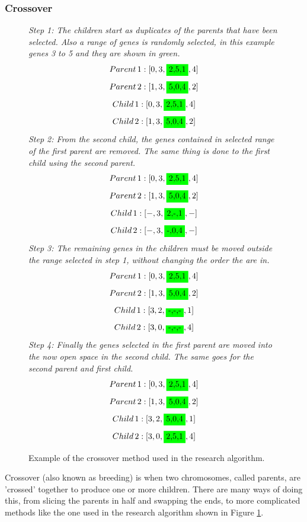 \subsubsection{Crossover}\label{crossover}
\par
\begin{figure}[H]
\textit{Step 1: The children start as duplicates of the parents that have been selected. Also a range of genes is randomly selected, in this example genes 3 to 5 and they are shown in green.}
\[Parent\, 1: [0,3,\colorbox{green}{2,5,1},4]\]
\[Parent\, 2: [1,3,\colorbox{green}{5,0,4},2]\]
\[Child\, 1: [0,3,\colorbox{green}{2,5,1},4]\]
\[Child\, 2: [1,3,\colorbox{green}{5,0,4},2]\]
\textit{Step 2: From the second child, the genes contained in selected range of the first parent are removed. The same thing is done to the first child using the second parent.}
\[Parent\, 1: [0,3,\colorbox{green}{2,5,1},4]\]
\[Parent\, 2: [1,3,\colorbox{green}{5,0,4},2]\]
\[Child\, 1: [-,3,\colorbox{green}{2,-,1},-]\]
\[Child\, 2: [-,3,\colorbox{green}{-,0,4},-]\]
\textit{Step 3: The remaining genes in the children must be moved outside the range selected in step 1, without changing the order the are in.}
\[Parent\, 1: [0,3,\colorbox{green}{2,5,1},4]\]
\[Parent\, 2: [1,3,\colorbox{green}{5,0,4},2]\]
\[Child\, 1: [3,2,\colorbox{green}{-,-,-},1]\]
\[Child\, 2: [3,0,\colorbox{green}{-,-,-},4]\]
\textit{Step 4: Finally the genes selected in the first parent are moved into the now open space in the second child. The same goes for the second parent and first child.}
\[Parent\, 1: [0,3,\colorbox{green}{2,5,1},4]\]
\[Parent\, 2: [1,3,\colorbox{green}{5,0,4},2]\]
\[Child\, 1: [3,2,\colorbox{green}{5,0,4},1]\]
\[Child\, 2: [3,0,\colorbox{green}{2,5,1},4]\]
\caption{Example of the crossover method used in the research algorithm. \label{fig:cross}}
\end{figure}
Crossover (also known as breeding) is when two chromosomes, called parents, are 'crossed' together to produce one or more children. There are many ways of doing this, from slicing the parents in half and swapping the ends, to more complicated methods like the one used in the research algorithm shown in Figure \ref{fig:cross}. 
